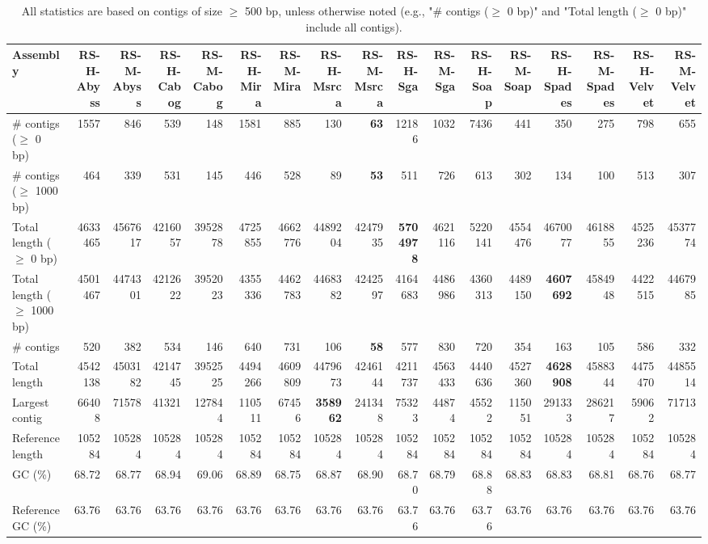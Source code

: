 \documentclass[12pt,a4paper]{article}
\begin{document}
\begin{table}[ht]
\begin{center}
\caption{All statistics are based on contigs of size $\geq$ 500 bp, unless otherwise noted (e.g., "\# contigs ($\geq$ 0 bp)" and "Total length ($\geq$ 0 bp)" include all contigs).}
\begin{tabular}{|l*{16}{|r}|}
\hline
Assembly & RS-H-Abyss & RS-M-Abyss & RS-H-Cabog & RS-M-Cabog & RS-H-Mira & RS-M-Mira & RS-H-Msrca & RS-M-Msrca & RS-H-Sga & RS-M-Sga & RS-H-Soap & RS-M-Soap & RS-H-Spades & RS-M-Spades & RS-H-Velvet & RS-M-Velvet \\ \hline
\# contigs ($\geq$ 0 bp) & 1557 & 846 & 539 & 148 & 1581 & 885 & 130 & {\bf 63} & 12186 & 1032 & 7436 & 441 & 350 & 275 & 798 & 655 \\ \hline
\# contigs ($\geq$ 1000 bp) & 464 & 339 & 531 & 145 & 446 & 528 & 89 & {\bf 53} & 511 & 726 & 613 & 302 & 134 & 100 & 513 & 307 \\ \hline
Total length ($\geq$ 0 bp) & 4633465 & 4567617 & 4216057 & 3952878 & 4725855 & 4662776 & 4489204 & 4247935 & {\bf 5704978} & 4621116 & 5220141 & 4554476 & 4670077 & 4618855 & 4525236 & 4537774 \\ \hline
Total length ($\geq$ 1000 bp) & 4501467 & 4474301 & 4212622 & 3952023 & 4355336 & 4462783 & 4468382 & 4242597 & 4164683 & 4486986 & 4360313 & 4489150 & {\bf 4607692} & 4584948 & 4422515 & 4467985 \\ \hline
\# contigs & 520 & 382 & 534 & 146 & 640 & 731 & 106 & {\bf 58} & 577 & 830 & 720 & 354 & 163 & 105 & 586 & 332 \\ \hline
Total length & 4542138 & 4503182 & 4214745 & 3952525 & 4494266 & 4609809 & 4479673 & 4246144 & 4211737 & 4563433 & 4440636 & 4527360 & {\bf 4628908} & 4588344 & 4475470 & 4485514 \\ \hline
Largest contig & 66408 & 71578 & 41321 & 127844 & 110511 & 67456 & {\bf 358962} & 241348 & 75323 & 44874 & 45522 & 115051 & 291333 & 286217 & 59062 & 71713 \\ \hline
Reference length & 105284 & 105284 & 105284 & 105284 & 105284 & 105284 & 105284 & 105284 & 105284 & 105284 & 105284 & 105284 & 105284 & 105284 & 105284 & 105284 \\ \hline
GC (\%) & 68.72 & 68.77 & 68.94 & 69.06 & 68.89 & 68.75 & 68.87 & 68.90 & 68.70 & 68.79 & 68.88 & 68.83 & 68.83 & 68.81 & 68.76 & 68.77 \\ \hline
Reference GC (\%) & 63.76 & 63.76 & 63.76 & 63.76 & 63.76 & 63.76 & 63.76 & 63.76 & 63.76 & 63.76 & 63.76 & 63.76 & 63.76 & 63.76 & 63.76 & 63.76 \\ \hline

\end{tabular}
\end{center}
\end{table}
\end{document}
